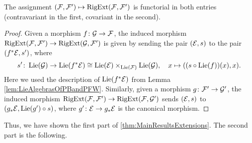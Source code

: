 \documentclass[../main.tex]{subfiles}
\begin{document}
\begin{lem}
  The assignment $(\mathcal{F}, \mathcal{F}') \mapsto \operatorname {RigExt}(\mathcal{F},\mathcal{F}')$ is functorial in both
  entries (contravariant in the first, covariant in the
  second). 
\begin{proof}
  Given a morphism 
  $f\colon \mathcal{G} \to \mathcal{F}$, the induced morphism $\operatorname {RigExt}(\mathcal{F}, \mathcal{F}') \to 
  \operatorname {RigExt}(\mathcal{G}, \mathcal{F}')$ is given by sending the pair $(\mathcal{E},s)$ to
  the pair $(f^*\mathcal{E}, s')$, where 
  \begin{equation*}
    s'\colon \operatorname{Lie}(\mathcal{G}) \to \operatorname{Lie}(f^*\mathcal{E}) \cong \operatorname{Lie}(\mathcal{E}) \times_{\operatorname{Lie}(\mathcal{F})} \operatorname{Lie}(\mathcal{G}),
    \quad x \mapsto ((s \circ \operatorname{Lie}(f)) (x), x). 
  \end{equation*}
  Here we used the description of $\operatorname{Lie}(f^*\mathcal{E})$ from Lemma
  \ref{lem:LieAlgebrasOfPBandPFW}.
  Similarly, given a morphism $g\colon \mathcal{F}' \to \mathcal{G}'$, the induced morphism 
  $\operatorname {RigExt}(\mathcal{F}, \mathcal{F}') \to \operatorname {RigExt}(\mathcal{F}, \mathcal{G}')$ sends $(\mathcal{E},s)$ to
  $(g_*\mathcal{E}, \operatorname{Lie}(g') \circ s)$, where $g'\colon \mathcal{E} \to g_* \mathcal{E}$ is the 
  canonical morphism.
\end{proof}
\end{lem}
Thus, we have shown the first part of \cref{thm:MainResultsExtensions}. 
The second part is the following.
\end{document}
